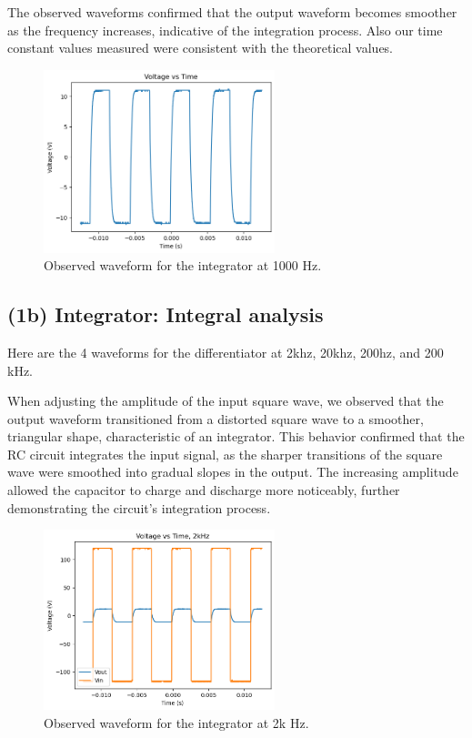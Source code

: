 \documentclass{article}
\begin{document}
The observed waveforms confirmed that the output waveform becomes smoother as 
the frequency increases, indicative of the integration process. Also our time constant values
measured were consistent with the theoretical values.

\begin{figure}[H]
    \centering
    \includegraphics[width=0.6\textwidth]{./img/Lab2_1a.png}  %
    \caption{Observed waveform for the integrator at 1000 Hz.}
    \label{fig:integrator_waveform}
\end{figure}

\subsection{(1b) Integrator: Integral analysis }
Here are the 4 waveforms for the differentiator at 2khz, 20khz, 200hz, and 200 kHz.

When adjusting the amplitude of the input square wave, we observed that the output waveform transitioned 
from a distorted square wave to a smoother, triangular shape, characteristic of an integrator. 
This behavior confirmed that the RC circuit integrates the input signal, as the sharper transitions 
of the square wave were smoothed into gradual slopes in the output. The increasing amplitude allowed 
the capacitor to charge and discharge more noticeably, further demonstrating the circuit's integration process.

\begin{figure}[H]
    \centering
    \includegraphics[width=0.6\textwidth]{./img/Lab2_1b_2k.png}  %
    \caption{Observed waveform for the integrator at 2k Hz.}
\end{figure}
\end{document}
